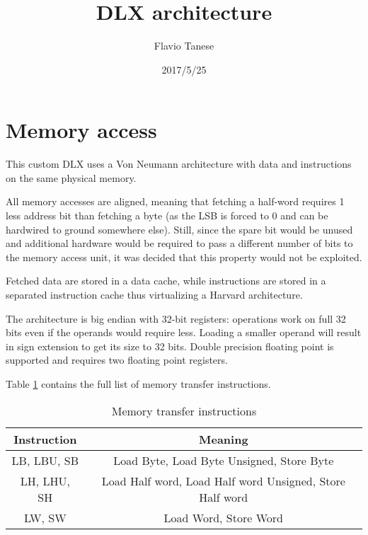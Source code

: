\documentclass[a4paper,10pt]{article}
\title{DLX architecture}
\author{Flavio Tanese}
\date{2017/5/25}
\begin{document}
\maketitle

\section{Memory access}
 This custom DLX uses a Von Neumann architecture with data and instructions on the same physical memory.
 
 All memory accesses are aligned, meaning that fetching a half-word requires 1 less address bit than fetching a byte
 (as the LSB is forced to 0 and can be hardwired to ground somewhere else). Still, since the spare bit would be unused
 and additional hardware would be required to pass a different number of bits to the memory access unit, it was decided
 that this property would not be exploited.
 
 Fetched data are stored in a data cache, while instructions are stored in a separated instruction cache thus
 virtualizing a Harvard architecture.
 
 The architecture is big endian with 32-bit registers: operations work on full 32 bits even if the operands would
 require less. Loading a smaller operand will result in sign extension to get its size to 32 bits. Double precision
 floating point is supported and requires two floating point registers.
 
 Table \ref{tb:MTI} contains the full list of memory transfer instructions.
 
 \begin{table}
  \begin{tabular}{|cc|}
   \hline
   Instruction & Meaning\\
   \hline
   LB, LBU, SB & Load Byte, Load Byte Unsigned, Store Byte\\
   LH, LHU, SH & Load Half word, Load Half word Unsigned, Store Half word\\
   LW, SW      & Load Word, Store Word\\
    
  \end{tabular}
  \label{tb:MTI}
  \caption{Memory transfer instructions}
 \end{table}
\end{document}
